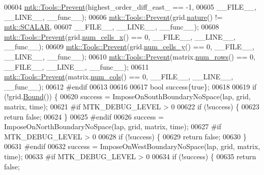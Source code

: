 \begin{DoxyCode}
00604   \hyperlink{classmtk_1_1Tools_a332324c6f25e66be9dff48c5987a3b9f}{mtk::Tools::Prevent}(highest\_order\_diff\_east\_ == -1,
00605                       \_\_FILE\_\_, \_\_LINE\_\_, \_\_func\_\_);
00606   \hyperlink{classmtk_1_1Tools_a332324c6f25e66be9dff48c5987a3b9f}{mtk::Tools::Prevent}(grid.\hyperlink{classmtk_1_1UniStgGrid2D_a99a3a9cdb05b7306be99bde935509e30}{nature}() != \hyperlink{namespacemtk_ga4c54f2a329cfb4e56213b02a259d19e2af481d45bd70d41381c7d72e200889205}{mtk::SCALAR},
00607                       \_\_FILE\_\_, \_\_LINE\_\_, \_\_func\_\_);
00608   \hyperlink{classmtk_1_1Tools_a332324c6f25e66be9dff48c5987a3b9f}{mtk::Tools::Prevent}(grid.\hyperlink{classmtk_1_1UniStgGrid2D_a2d182866a398aba8e4829590e85bf939}{num\_cells\_x}() == 0, \_\_FILE\_\_, \_\_LINE\_\_, \_\_func\_\_);
00609   \hyperlink{classmtk_1_1Tools_a332324c6f25e66be9dff48c5987a3b9f}{mtk::Tools::Prevent}(grid.\hyperlink{classmtk_1_1UniStgGrid2D_aed05a801cc9a76dba0ff203cea58a61a}{num\_cells\_y}() == 0, \_\_FILE\_\_, \_\_LINE\_\_, \_\_func\_\_);
00610   \hyperlink{classmtk_1_1Tools_a332324c6f25e66be9dff48c5987a3b9f}{mtk::Tools::Prevent}(matrix.\hyperlink{classmtk_1_1DenseMatrix_a53f3afb3b6a8d21854458aaa9663cc74}{num\_rows}() == 0, \_\_FILE\_\_, \_\_LINE\_\_, \_\_func\_\_);
00611   \hyperlink{classmtk_1_1Tools_a332324c6f25e66be9dff48c5987a3b9f}{mtk::Tools::Prevent}(matrix.\hyperlink{classmtk_1_1DenseMatrix_a41747502d468c6728a4be31501b16e0e}{num\_cols}() == 0, \_\_FILE\_\_, \_\_LINE\_\_, \_\_func\_\_);
00612 \textcolor{preprocessor}{  #endif}
00613 
00616 
00617   \textcolor{keywordtype}{bool} success\{\textcolor{keyword}{true}\};
00618 
00619   \textcolor{keywordflow}{if} (!grid.\hyperlink{classmtk_1_1UniStgGrid2D_aa651194ccd0321a7c61a8f56fa5e8455}{Bound}()) \{
00620     success = ImposeOnSouthBoundaryNoSpace(lap, grid, matrix, time);
00621 \textcolor{preprocessor}{    #if MTK\_DEBUG\_LEVEL > 0}
00622     \textcolor{keywordflow}{if} (!success) \{
00623       \textcolor{keywordflow}{return} \textcolor{keyword}{false};
00624     \}
00625 \textcolor{preprocessor}{    #endif}
00626     success = ImposeOnNorthBoundaryNoSpace(lap, grid, matrix, time);
00627 \textcolor{preprocessor}{    #if MTK\_DEBUG\_LEVEL > 0}
00628     \textcolor{keywordflow}{if} (!success) \{
00629       \textcolor{keywordflow}{return} \textcolor{keyword}{false};
00630     \}
00631 \textcolor{preprocessor}{    #endif}
00632     success = ImposeOnWestBoundaryNoSpace(lap, grid, matrix, time);
00633 \textcolor{preprocessor}{    #if MTK\_DEBUG\_LEVEL > 0}
00634     \textcolor{keywordflow}{if} (!success) \{
00635       \textcolor{keywordflow}{return} \textcolor{keyword}{false};

\end{DoxyCode}
